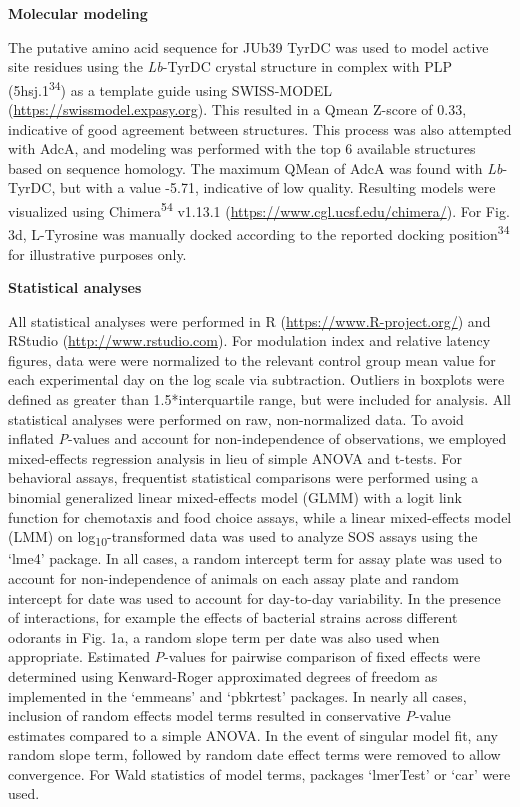 \documentclass[11pt,]{article}
\begin{document}
\vspace{2\parsep}

\noindent \textbf{Molecular modeling}

The putative amino acid sequence for JUb39 TyrDC was used to model
active site residues using the \emph{Lb}-TyrDC crystal structure in
complex with PLP (5hsj.1\textsuperscript{34}) as a template guide using
SWISS-MODEL (\url{https://swissmodel.expasy.org}). This resulted in a
Qmean Z-score of 0.33, indicative of good agreement between structures.
This process was also attempted with AdcA, and modeling was performed
with the top 6 available structures based on sequence homology. The
maximum QMean of AdcA was found with \emph{Lb}-TyrDC, but with a value
-5.71, indicative of low quality. Resulting models were visualized using
Chimera\textsuperscript{54} v1.13.1
(\url{https://www.cgl.ucsf.edu/chimera/}). For Fig. 3d, L-Tyrosine was
manually docked according to the reported docking
position\textsuperscript{34} for illustrative purposes only.

\vspace{2\parsep}

\noindent \textbf{Statistical analyses}

All statistical analyses were performed in R
(\url{https://www.R-project.org/}) and RStudio
(\url{http://www.rstudio.com}). For modulation index and relative
latency figures, data were were normalized to the relevant control group
mean value for each experimental day on the log scale via subtraction.
Outliers in boxplots were defined as greater than 1.5*interquartile
range, but were included for analysis. All statistical analyses were
performed on raw, non-normalized data. To avoid inflated \emph{P}-values
and account for non-independence of observations, we employed
mixed-effects regression analysis in lieu of simple ANOVA and t-tests.
For behavioral assays, frequentist statistical comparisons were
performed using a binomial generalized linear mixed-effects model (GLMM)
with a logit link function for chemotaxis and food choice assays, while
a linear mixed-effects model (LMM) on log\textsubscript{10}-transformed
data was used to analyze SOS assays using the `lme4' package. In all
cases, a random intercept term for assay plate was used to account for
non-independence of animals on each assay plate and random intercept for
date was used to account for day-to-day variability. In the presence of
interactions, for example the effects of bacterial strains across
different odorants in Fig. 1a, a random slope term per date was also
used when appropriate. Estimated \emph{P}-values for pairwise comparison
of fixed effects were determined using Kenward-Roger approximated
degrees of freedom as implemented in the `emmeans' and `pbkrtest'
packages. In nearly all cases, inclusion of random effects model terms
resulted in conservative \emph{P}-value estimates compared to a simple
ANOVA. In the event of singular model fit, any random slope term,
followed by random date effect terms were removed to allow convergence.
For Wald statistics of model terms, packages `lmerTest' or `car' were
used.
\end{document}
